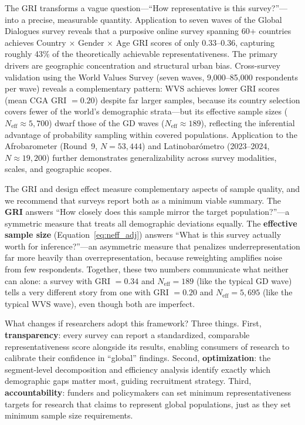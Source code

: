 \documentclass[11pt,a4paper]{article}
\begin{document}
The GRI transforms a vague question---``How representative is this survey?''---into a precise, measurable quantity. Application to seven waves of the Global Dialogues survey reveals that a purposive online survey spanning 60+ countries achieves Country $\times$ Gender $\times$ Age GRI scores of only 0.33--0.36, capturing roughly 43\% of the theoretically achievable representativeness. The primary drivers are geographic concentration and structural urban bias. Cross-survey validation using the World Values Survey (seven waves, 9{,}000--85{,}000 respondents per wave) reveals a complementary pattern: WVS achieves lower GRI scores (mean CGA GRI $= 0.20$) despite far larger samples, because its country selection covers fewer of the world's demographic strata---but its effective sample sizes ($N_{\text{eff}} \approx 5{,}700$) dwarf those of the GD waves ($N_{\text{eff}} \approx 189$), reflecting the inferential advantage of probability sampling within covered populations. Application to the Afrobarometer (Round~9, $N = 53{,}444$) and Latinobar\'ometro (2023--2024, $N \approx 19{,}200$) further demonstrates generalizability across survey modalities, scales, and geographic scopes.

The GRI and design effect measure complementary aspects of sample quality, and we recommend that surveys report both as a minimum viable summary. The \textbf{GRI} answers ``How closely does this sample mirror the target population?''---a symmetric measure that treats all demographic deviations equally. The \textbf{effective sample size} (Equation~\ref{eq:neff_adj}) answers ``What is this survey actually worth for inference?''---an asymmetric measure that penalizes underrepresentation far more heavily than overrepresentation, because reweighting amplifies noise from few respondents. Together, these two numbers communicate what neither can alone: a survey with GRI $= 0.34$ and $N_{\text{eff}} = 189$ (like the typical GD wave) tells a very different story from one with GRI $= 0.20$ and $N_{\text{eff}} = 5{,}695$ (like the typical WVS wave), even though both are imperfect.

What changes if researchers adopt this framework? Three things. First, \textbf{transparency}: every survey can report a standardized, comparable representativeness score alongside its results, enabling consumers of research to calibrate their confidence in ``global'' findings. Second, \textbf{optimization}: the segment-level decomposition and efficiency analysis identify exactly which demographic gaps matter most, guiding recruitment strategy. Third, \textbf{accountability}: funders and policymakers can set minimum representativeness targets for research that claims to represent global populations, just as they set minimum sample size requirements.
\end{document}
